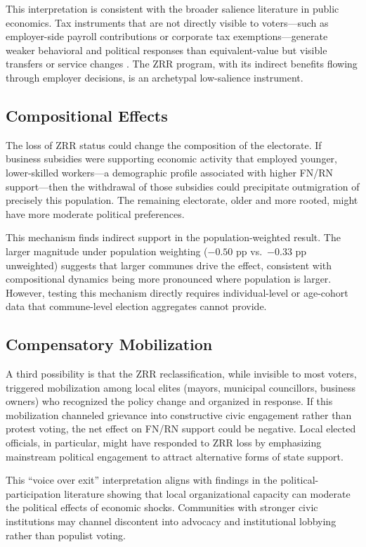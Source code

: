 \documentclass[12pt]{article}
\begin{document}
This interpretation is consistent with the broader salience literature in public economics. Tax instruments that are not directly visible to voters---such as employer-side payroll contributions or corporate tax exemptions---generate weaker behavioral and political responses than equivalent-value but visible transfers or service changes \citep{chetty2009salience, finkelstein2009ez}. The ZRR program, with its indirect benefits flowing through employer decisions, is an archetypal low-salience instrument.

\subsection{Compositional Effects}

The loss of ZRR status could change the composition of the electorate. If business subsidies were supporting economic activity that employed younger, lower-skilled workers---a demographic profile associated with higher FN/RN support---then the withdrawal of those subsidies could precipitate outmigration of precisely this population. The remaining electorate, older and more rooted, might have more moderate political preferences.

This mechanism finds indirect support in the population-weighted result. The larger magnitude under population weighting ($-0.50$ pp vs.\ $-0.33$ pp unweighted) suggests that larger communes drive the effect, consistent with compositional dynamics being more pronounced where population is larger. However, testing this mechanism directly requires individual-level or age-cohort data that commune-level election aggregates cannot provide.

\subsection{Compensatory Mobilization}

A third possibility is that the ZRR reclassification, while invisible to most voters, triggered mobilization among local elites (mayors, municipal councillors, business owners) who recognized the policy change and organized in response. If this mobilization channeled grievance into constructive civic engagement rather than protest voting, the net effect on FN/RN support could be negative. Local elected officials, in particular, might have responded to ZRR loss by emphasizing mainstream political engagement to attract alternative forms of state support.

This ``voice over exit'' interpretation aligns with findings in the political-participation literature showing that local organizational capacity can moderate the political effects of economic shocks. Communities with stronger civic institutions may channel discontent into advocacy and institutional lobbying rather than populist voting.
\end{document}

